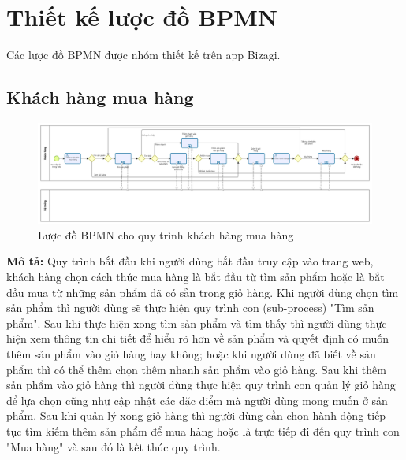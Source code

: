 \section{Thiết kế lược đồ BPMN}

Các lược đồ BPMN được nhóm thiết kế trên app Bizagi.
\subsection{Khách hàng mua hàng}
    \begin{figure}[!htp]
        \centering
        \includegraphics[width=17cm]{img/BPMN/customer_buy/customer_buy.png}
        \newline
        \caption{Lược đồ BPMN cho quy trình khách hàng mua hàng}
    \end{figure}
    \textbf{Mô tả:} Quy trình bắt đầu khi người dùng bắt đầu truy cập vào trang web, khách hàng chọn cách thức mua hàng là bắt đầu từ tìm sản phẩm hoặc là bắt đầu mua từ những sản phẩm đã có sẵn trong giỏ hàng. Khi người dùng chọn tìm sản phẩm thì người dùng sẽ thực hiện quy trình con (sub-process) "Tìm sản phẩm". Sau khi thực hiện xong tìm sản phẩm và tìm thấy thì người dùng thực hiện xem thông tin chi tiết để hiểu rõ hơn về sản phẩm và quyết định có muốn thêm sản phẩm vào giỏ hàng hay không; hoặc khi người dùng đã biết về sản phẩm thì có thể thêm chọn thêm nhanh sản phẩm vào giỏ hàng. Sau khi thêm sản phẩm vào giỏ hàng thì người dùng thực hiện quy trình con quản lý giỏ hàng để lựa chọn cũng như cập nhật các đặc điểm mà người dùng mong muốn ở sản phẩm. Sau khi quản lý xong giỏ hàng thì người dùng cần chọn hành động tiếp tục tìm kiếm thêm sản phẩm để mua hàng hoặc là trực tiếp đi đến quy trình con "Mua hàng" và sau đó là kết thúc quy trình.


